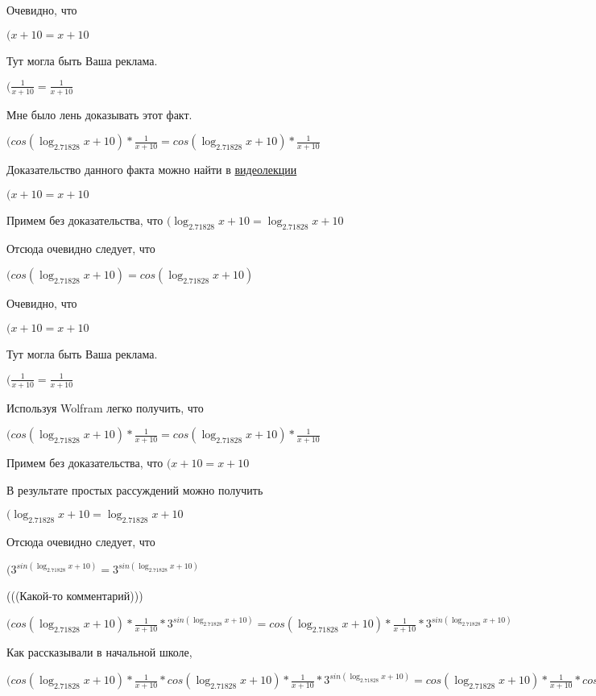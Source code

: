 \documentclass[12pt,a4paper,fleqn]{article}
\theoremstyle{definition}
\begin{document}
Очевидно, что

$( x  +  10  =  x  +  10 $

Тут могла быть Ваша реклама.

$(\frac{ 1 }{ x  +  10 }
 = \frac{ 1 }{ x  +  10 }
$

Мне было лень доказывать этот факт.

$(cos(\log_{ 2.71828 }{ x  +  10 }) * \frac{ 1 }{ x  +  10 }
 = cos(\log_{ 2.71828 }{ x  +  10 }) * \frac{ 1 }{ x  +  10 }
$

Доказательство данного факта можно найти в \href{https://www.youtube.com/watch?v=dQw4w9WgXcQ}{видеолекции}

$( x  +  10  =  x  +  10 $

Примем без доказательства, что
$(\log_{ 2.71828 }{ x  +  10 } = \log_{ 2.71828 }{ x  +  10 }$

Отсюда очевидно следует, что

$(cos(\log_{ 2.71828 }{ x  +  10 }) = cos(\log_{ 2.71828 }{ x  +  10 })$

Очевидно, что

$( x  +  10  =  x  +  10 $

Тут могла быть Ваша реклама.

$(\frac{ 1 }{ x  +  10 }
 = \frac{ 1 }{ x  +  10 }
$

Используя Wolfram легко получить, что

$(cos(\log_{ 2.71828 }{ x  +  10 }) * \frac{ 1 }{ x  +  10 }
 = cos(\log_{ 2.71828 }{ x  +  10 }) * \frac{ 1 }{ x  +  10 }
$

Примем без доказательства, что
$( x  +  10  =  x  +  10 $

В результате простых рассуждений можно получить

$(\log_{ 2.71828 }{ x  +  10 } = \log_{ 2.71828 }{ x  +  10 }$

Отсюда очевидно следует, что

$({ 3 }^{sin(\log_{ 2.71828 }{ x  +  10 })} = { 3 }^{sin(\log_{ 2.71828 }{ x  +  10 })}$

(((Какой-то комментарий)))

$(cos(\log_{ 2.71828 }{ x  +  10 }) * \frac{ 1 }{ x  +  10 }
 * { 3 }^{sin(\log_{ 2.71828 }{ x  +  10 })} = cos(\log_{ 2.71828 }{ x  +  10 }) * \frac{ 1 }{ x  +  10 }
 * { 3 }^{sin(\log_{ 2.71828 }{ x  +  10 })}$

Как рассказывали в начальной школе,

$(cos(\log_{ 2.71828 }{ x  +  10 }) * \frac{ 1 }{ x  +  10 }
 * cos(\log_{ 2.71828 }{ x  +  10 }) * \frac{ 1 }{ x  +  10 }
 * { 3 }^{sin(\log_{ 2.71828 }{ x  +  10 })} = cos(\log_{ 2.71828 }{ x  +  10 }) * \frac{ 1 }{ x  +  10 }
 * cos(\log_{ 2.71828 }{ x  +  10 }) * \frac{ 1 }{ x  +  10 }
 * { 3 }^{sin(\log_{ 2.71828 }{ x  +  10 })}$
\end{document}
